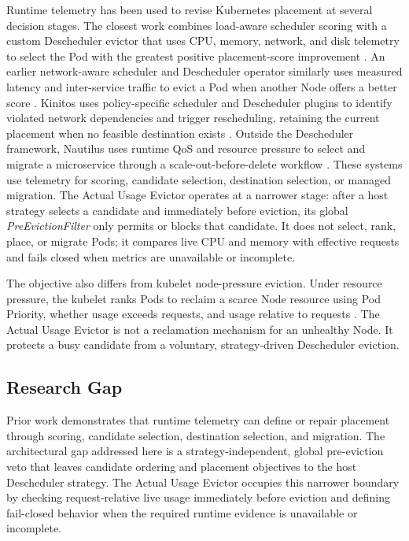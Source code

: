 Runtime telemetry has been used to revise Kubernetes placement at several
decision stages. The closest work combines load-aware scheduler scoring with a
custom Descheduler evictor that uses CPU, memory, network, and disk telemetry
to select the Pod with the greatest positive placement-score improvement
\citep{marchese2025enhancing}. An earlier network-aware scheduler and
Descheduler operator similarly uses measured latency and inter-service traffic
to evict a Pod when another Node offers a better score
\citep{marchese2022network}. Kinitos uses policy-specific scheduler and
Descheduler plugins to identify violated network dependencies and trigger
rescheduling, retaining the current placement when no feasible destination
exists \citep{tsokov2025kinitos}. Outside the Descheduler framework, Nautilus
uses runtime QoS and resource pressure to select and migrate a microservice
through a scale-out-before-delete workflow \citep{fu2022adaptive}. These
systems use telemetry for scoring, candidate selection, destination selection,
or managed migration. The Actual Usage Evictor operates at a narrower stage:
after a host strategy selects a candidate and immediately before eviction, its
global \textit{PreEvictionFilter} only permits or blocks that candidate. It
does not select, rank, place, or migrate Pods; it compares live CPU and memory
with effective requests and fails closed when metrics are unavailable or
incomplete.

The objective also differs from kubelet node-pressure eviction. Under resource
pressure, the kubelet ranks Pods to reclaim a scarce Node resource using Pod
Priority, whether usage exceeds requests, and usage relative to requests
\citep{k8s_node_pressure_eviction}. The Actual Usage Evictor is not a
reclamation mechanism for an unhealthy Node. It protects a busy candidate from
a voluntary, strategy-driven Descheduler eviction.

\subsection{Research Gap}

Prior work demonstrates that runtime telemetry can define or repair placement
through scoring, candidate selection, destination selection, and migration.
The architectural gap addressed here is a strategy-independent, global
pre-eviction veto that leaves candidate ordering and placement objectives to
the host Descheduler strategy. The Actual Usage Evictor occupies this narrower
boundary by checking request-relative live usage immediately before eviction
and defining fail-closed behavior when the required runtime evidence is
unavailable or incomplete.

